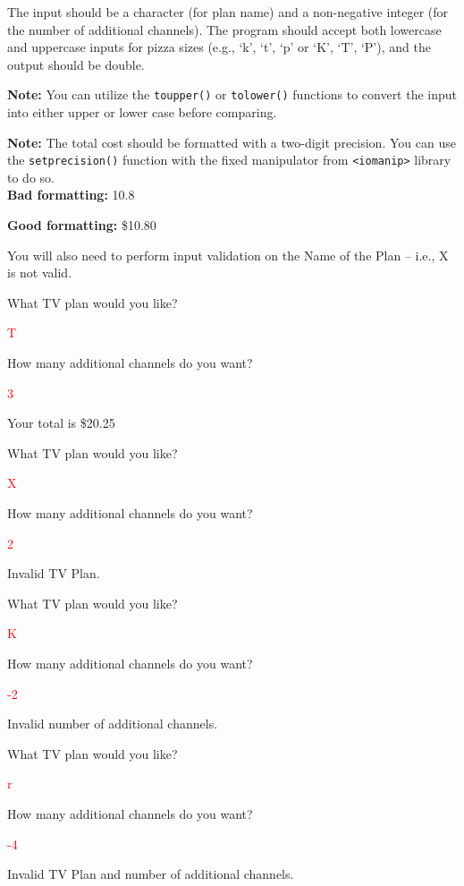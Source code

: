 The input should be a character (for plan name) and a non-negative integer (for the number of additional channels). The program should accept both lowercase and uppercase inputs for pizza sizes (e.g., `k', `t', `p' or `K', `T', `P'), and the output should be double.

\textbf{Note:} You can utilize the \texttt{toupper()} or \texttt{tolower()} functions to convert the input into either upper or lower case before comparing. 

\textbf{Note:} The total cost should be formatted with a two-digit precision. You can use the \texttt{setprecision()} function with the fixed manipulator from \texttt{<iomanip>} library to do so.\\

\textbf{Bad formatting:} 10.8

\textbf{Good formatting:} \$10.80

You will also need to perform input validation on the Name of the Plan -- i.e., X is not valid. 

\begin{sample}
What TV plan would you like?

\textcolor{red}{T}

How many additional channels do you want?

\textcolor{red}{3}

Your total is \$20.25
\end{sample}

\begin{sample}
What TV plan would you like?

\textcolor{red}{X}

How many additional channels do you want?

\textcolor{red}{2}

Invalid TV Plan.
\end{sample}

\begin{sample}
What TV plan would you like?

\textcolor{red}{K}

How many additional channels do you want?

\textcolor{red}{-2}

Invalid number of additional channels.
\end{sample}

\begin{sample}
What TV plan would you like?

\textcolor{red}{r}

How many additional channels do you want?

\textcolor{red}{-4}

Invalid TV Plan and number of additional channels.
\end{sample}


